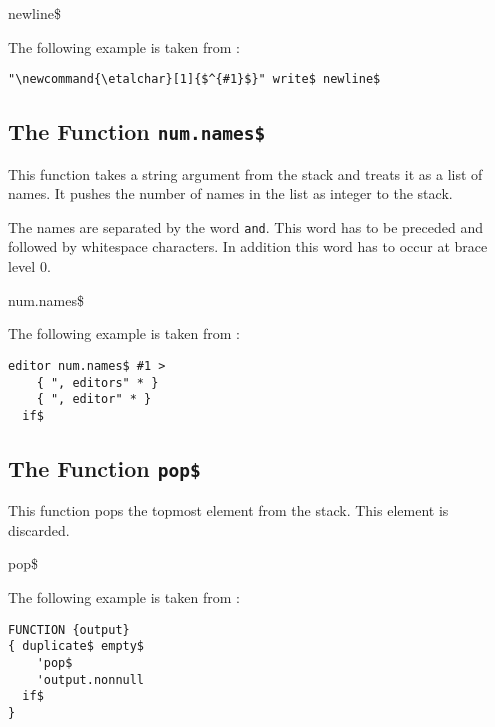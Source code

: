 \begin{BstFunction}{newline\$}
\end{BstFunction}

The following example is taken from :

\begin{lstlisting}[language=bst]
  "\newcommand{\etalchar}[1]{$^{#1}$}" write$ newline$
\end{lstlisting}


\subsection{The Function \texttt{num.names\$}}%

This function takes a string argument from the stack and treats it as
a list of names. It pushes the number of names in the list as integer
to the stack.

The names are separated by the word \texttt{and}. This word
has to be preceded and followed by whitespace characters. In addition
this word has to occur at brace level 0.

\begin{BstFunction}{num.names\$}
\end{BstFunction}

The following example is taken from :

\begin{lstlisting}[language=bst]
  editor num.names$ #1 >
    { ", editors" * }
    { ", editor" * }
  if$
\end{lstlisting}\fctIndex{>}\fctIndex{*}


\subsection{The Function \texttt{pop\$}}%

This function pops the topmost element from the stack. This element is
discarded.

\begin{BstFunction}{pop\$}
\end{BstFunction}

The following example is taken from :

\begin{lstlisting}[language=bst]
FUNCTION {output}
{ duplicate$ empty$
    'pop$
    'output.nonnull
  if$
}
\end{lstlisting}

